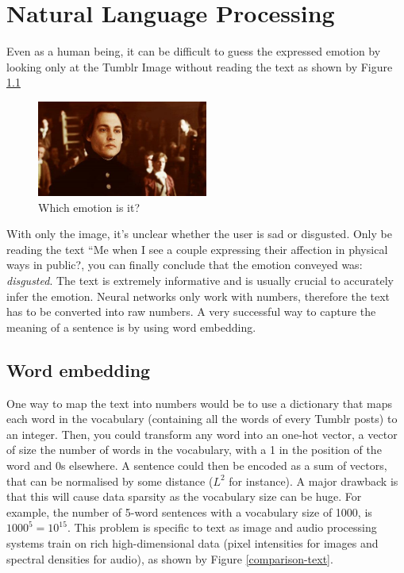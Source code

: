 \chapter{Natural Language Processing}
Even as a human being, it can be difficult to guess the expressed emotion by looking only at the Tumblr Image without reading the text as shown by Figure \ref{disgusted-unclear}

\begin{figure}[H]
    \centering
    \includegraphics[width=0.5\textwidth]{Images/disgusted.jpg}
    \caption{Which emotion is it?}
    \label{disgusted-unclear}
\end{figure}

With only the image, it's unclear whether the user is sad or disgusted. Only be reading the text ``Me when I see a couple expressing their affection in physical ways in public?, you can finally conclude that the emotion conveyed was: {\em disgusted}. The text is extremely informative and is usually crucial to accurately infer the emotion. Neural networks only work with numbers, therefore the text has to be converted into raw numbers. A very successful way to capture the meaning of a sentence is by using word embedding.
\newpage
\section{Word embedding}
One way to map the text into numbers would be to use a dictionary that maps each word in the vocabulary (containing all the words of every Tumblr posts) to an integer. Then, you could transform any word into an one-hot vector, a vector of size the number of words in the vocabulary, with a 1 in the position of the word and 0s elsewhere. A sentence could then be encoded as a sum of vectors, that can be normalised by some distance ($L^2$ for instance). A major drawback is that this will cause data sparsity as the vocabulary size can be huge. For example, the number of 5-word sentences with a vocabulary size of 1000, is $1000^5=10^{15}$. This problem is specific to text as image and audio processing systems train on rich high-dimensional data (pixel intensities for images and spectral densities for audio), as shown by Figure \ref{comparison-text}.

